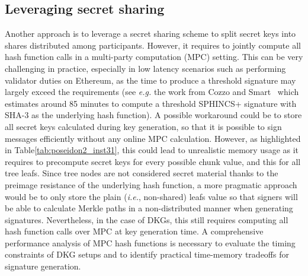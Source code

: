 \subsection{Leveraging secret sharing}
Another approach is to leverage a secret sharing scheme to split \WOTS secret keys into shares distributed among participants.
However, it requires to jointly compute all hash function calls in a multi-party computation (MPC) setting.
This can be very challenging in practice, especially in low latency scenarios such as performing validator duties on Ethereum, as the time to produce a threshold signature may largely exceed the requirements (see \textit{e.g.} the work from Cozzo and Smart~\cite{sharing_luov19} which estimates around 85 minutes to compute a threshold \textsf{SPHINCS+} signature with \textsf{SHA-3} as the underlying hash function).
A possible workaround could be to store all secret keys calculated during key generation, so that it is possible to sign messages efficiently without any online MPC calculation.
However, as highlighted in Table\ref{tab:poseidon2_inst31}, this could lead to unrealistic memory usage as it requires to precompute secret keys for every possible chunk value, and this for all tree leafs.
Since tree nodes are not considered secret material thanks to the preimage resistance of the underlying hash function, a more pragmatic approach would be to only store the plain (\textit{i.e.}, non-shared) leafs value so that signers will be able to calculate Merkle paths in a non-distributed manner when generating signatures.
Nevertheless, in the case of DKGs, this still requires computing all hash function calls over MPC at key generation time.
A comprehensive performance analysis of MPC hash functions is necessary to evaluate the timing constraints of DKG setups and to identify practical time-memory tradeoffs for signature generation.





